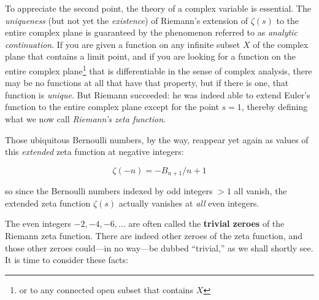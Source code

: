 \documentclass[openany]{book}
\theoremstyle{plain}
\theoremstyle{definition}
\begin{document}
To appreciate the second point, the theory of a complex variable is
essential. The {\it uniqueness} (but not yet the {\it existence}) of
Riemann's extension of $\zeta(s)$ to the entire complex plane is
guaranteed by the phenomenon referred to as {\it analytic
  continuation}.  If you are given a function on any infinite subset
$X$ of the complex plane that contains a limit point, and if you are
looking for a function on the entire complex plane{\footnote{ or to
    any connected open subset that contains $X$}} that is
differentiable in the sense of complex analysis, there may be no
functions at all that have that property, but if there is one, that
function is {\it unique}.  But Riemann succeeded: he was indeed able
to extend Euler's function to the entire complex plane except for the
point $s=1$, thereby defining what we now call {\it Riemann's zeta
  function}.  \vskip20pt

 Those ubiquitous Bernoulli numbers, by the way, reappear yet again as
 values of this {\it extended} zeta function at negative integers:

  $$\zeta(-n) = -B_{n+1}/n+1$$

  so since the Bernoulli numbers indexed by odd integers $>1$ all
  vanish, the extended zeta function $\zeta(s)$ actually vanishes at
  {\it all} even integers.

  The even integers $-2, -4, -6, \dots$ are often called the {\bf
    trivial zeroes} of the Riemann zeta function.  There are indeed
  other zeroes of the zeta function, and those other zeroes could---in no way---be
  dubbed ``trivial,'' as we shall shortly see.\vskip20pt It is time to
  consider these facts:
\end{document}
